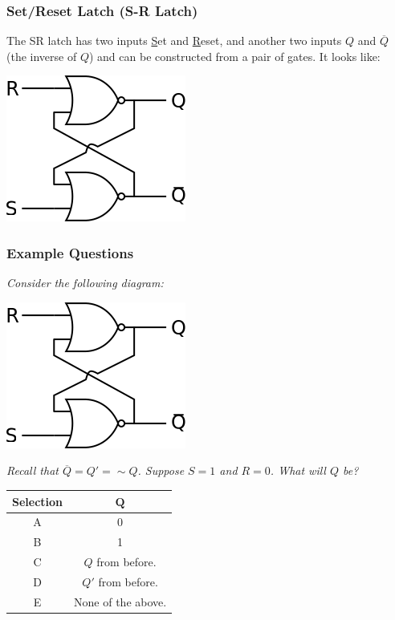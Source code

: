 \documentclass[letterpaper]{article}
\begin{document}
\subsubsection{Set/Reset Latch (S-R Latch)}
The SR latch has two inputs \underline{S}et and \underline{R}eset, and another two inputs $Q$ and $\overline{Q}$ (the inverse of $Q$) and can be constructed from a pair of  gates. It looks like:
\begin{center}
    \includegraphics[scale=0.5]{img/SR_latch.png}
\end{center}

\subsubsection{Example Questions}
\emph{Consider the following diagram:}
\begin{center}
    \includegraphics[scale=0.5]{img/SR_latch.png}
\end{center}
\emph{Recall that $\overline{Q} = Q' = \sim Q$. Suppose $S = 1$ and $R = 0$. What will $Q$ be?}
\begin{center}
    \begin{tabular}{c|c}
        \textbf{Selection} & $\mathbf{Q}$ \\ 
        \hline 
        A & 0 \\ 
        B & 1 \\ 
        C & $Q$ from before. \\ 
        D & $Q'$ from before. \\ 
        E & None of the above.
    \end{tabular}
\end{center}
\end{document}
